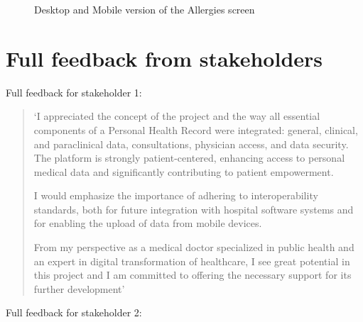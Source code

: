 \begin{figure}[ht]
    \centering
    \hspace{0.05\textwidth}
    \caption{Desktop and Mobile version of the Allergies screen}
\end{figure}

\chapter{Full feedback from stakeholders}\label{sec:full_feedback}

Full feedback for stakeholder 1:

\begin{quotation}
`I appreciated the concept of the project and the way all essential components of a Personal Health Record were integrated: general, clinical, and paraclinical data, consultations, physician access, and data security. The platform is strongly patient-centered, enhancing access to personal medical data and significantly contributing to patient empowerment.

I would emphasize the importance of adhering to interoperability standards, both for future integration with hospital software systems and for enabling the upload of data from mobile devices.

From my perspective as a medical doctor specialized in public health and an expert in digital transformation of healthcare, I see great potential in this project and I am committed to offering the necessary support for its further development'
\end{quotation}

Full feedback for stakeholder 2:

